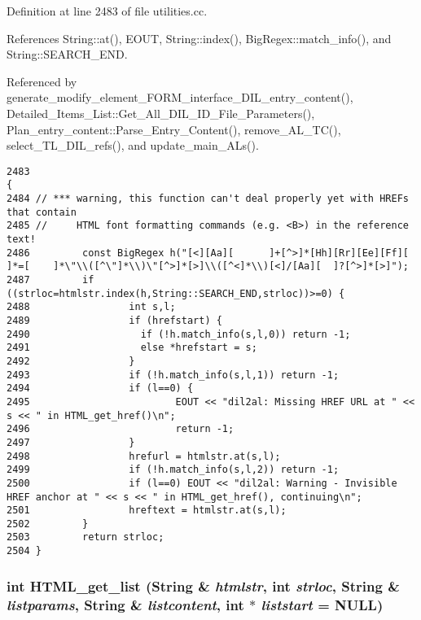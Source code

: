 Definition at line 2483 of file utilities.cc.

References String::at(), EOUT, String::index(), Big\-Regex::match\_\-info(), and String::SEARCH\_\-END.

Referenced by generate\_\-modify\_\-element\_\-FORM\_\-interface\_\-DIL\_\-entry\_\-content(), Detailed\_\-Items\_\-List::Get\_\-All\_\-DIL\_\-ID\_\-File\_\-Parameters(), Plan\_\-entry\_\-content::Parse\_\-Entry\_\-Content(), remove\_\-AL\_\-TC(), select\_\-TL\_\-DIL\_\-refs(), and update\_\-main\_\-ALs().



\footnotesize\begin{verbatim}2483                                                                                                              {
2484 // *** warning, this function can't deal properly yet with HREFs that contain
2485 //     HTML font formatting commands (e.g. <B>) in the reference text!
2486         const BigRegex h("[<][Aa][      ]+[^>]*[Hh][Rr][Ee][Ff][        ]*=[    ]*\"\\([^\"]*\\)\"[^>]*[>]\\([^<]*\\)[<]/[Aa][  ]?[^>]*[>]");
2487         if ((strloc=htmlstr.index(h,String::SEARCH_END,strloc))>=0) {
2488                 int s,l;
2489                 if (hrefstart) {
2490                   if (!h.match_info(s,l,0)) return -1;
2491                   else *hrefstart = s;
2492                 }
2493                 if (!h.match_info(s,l,1)) return -1;
2494                 if (l==0) {
2495                         EOUT << "dil2al: Missing HREF URL at " << s << " in HTML_get_href()\n";
2496                         return -1;
2497                 }
2498                 hrefurl = htmlstr.at(s,l);
2499                 if (!h.match_info(s,l,2)) return -1;
2500                 if (l==0) EOUT << "dil2al: Warning - Invisible HREF anchor at " << s << " in HTML_get_href(), continuing\n";
2501                 hreftext = htmlstr.at(s,l);
2502         }
2503         return strloc;
2504 }
\end{verbatim}\normalsize 
{}
\subsubsection{\setlength{\rightskip}{0pt plus 5cm}int HTML\_\-get\_\-list ({\bf String} \& {\em htmlstr}, int {\em strloc}, {\bf String} \& {\em listparams}, {\bf String} \& {\em listcontent}, int $\ast$ {\em liststart} = NULL)}\label{dil2al_8hh_a255}




